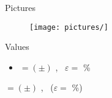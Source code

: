 Pictures
\begin{figure}[h]
    \centering
    \texttt{[image: pictures/]} %
    \caption{}
\end{figure}


Values
\begin{itemize}
    \item $ = \left( \pm  \right)$ , \ $\varepsilon = $ \% 
\end{itemize}

$ = \left( \pm  \right)$ , \ ($\varepsilon = $ \%)
